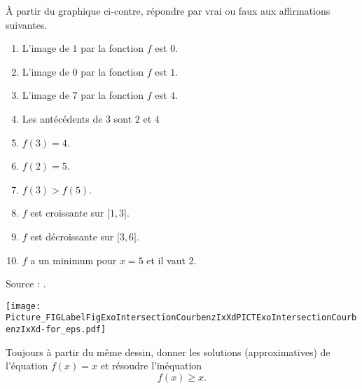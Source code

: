 
\begin{exercice}\label{exoSeconde-0069}

    \begin{multicols}{2}

À partir du graphique ci-contre, répondre par vrai ou faux aux affirmations suivantes.

\begin{enumerate}
    \item
       L'image de \( 1\) par la fonction \( f\) est \( 0\).
   \item
       L'image de \( 0\) par la fonction \( f\) est \( 1\).
   \item
       L'image de \( 7\) par la fonction \( f\) est \( 4\).
   \item
       Les antécédents de \( 3\) sont \( 2\) et \( 4\)
   \item
       \( f(3)=4\).
   \item
       \( f(2)=5\).
   \item
       \( f(3)>f(5)\).
   \item
       \( f\) est croissante sur \( \mathopen[ 1 , 3 \mathclose]\).
   \item
       \( f\) est décroissante sur \( \mathopen[ 3 , 6 \mathclose]\).
    \item
        \( f\) a un minimum pour \( x=5\) et il vaut \( 2\).

\end{enumerate}
Source : \cite{BPizfV}.

\columnbreak


\texttt{[image: Picture\_FIGLabelFigExoIntersectionCourbenzIxXdPICTExoIntersectionCourbenzIxXd-for\_eps.pdf]}

    \end{multicols}

Toujours à partir du même dessin, donner les solutions (approximatives) de l'équation \( f(x)=x\) et résoudre l'inéquation
\begin{equation}
    f(x)\geq x.
\end{equation}

\end{exercice}
